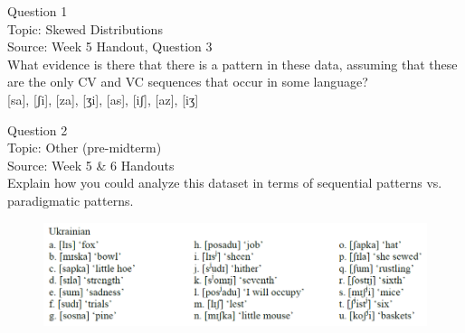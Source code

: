 \documentclass[12pt]{article}
\begin{document}
\begin{center}
\textbf{{\color{blue}{\HUGE START OF EXAM\\}}}

\textbf{{\color{blue}{\HUGE Student ID: 33446\\}}}

\textbf{{\color{blue}{\HUGE 4:00\\}}}

\end{center}
\newpage

{\large Question 1}\\

Topic: Skewed Distributions\\
Source: Week 5 Handout, Question 3\\

What evidence is there that there is a pattern in these data, assuming that these are the only CV and VC sequences that occur in some language?\\

{[sa]}, {[ʃi]}, {[za]}, {[ʒi]}, {[as]}, {[iʃ]}, {[az]}, {[iʒ]}


\newpage

{\large Question 2}\\

Topic: Other (pre-midterm)\\
Source: Week 5 \& 6 Handouts\\

Explain how you could analyze this dataset in terms of sequential patterns vs. paradigmatic patterns.\\

\begin{figure}[H]
\includegraphics{../images/ukrainian.png}
\end{figure}

\newpage

\begin{center}
\textbf{{\color{red}{\HUGE END OF EXAM}}}\\

\end{center}
\newpage

\begin{center}
\textbf{{\color{blue}{\HUGE START OF EXAM\\}}}

\textbf{{\color{blue}{\HUGE Student ID: 27762\\}}}

\textbf{{\color{blue}{\HUGE 4:10\\}}}

\end{center}
\newpage
\end{document}
